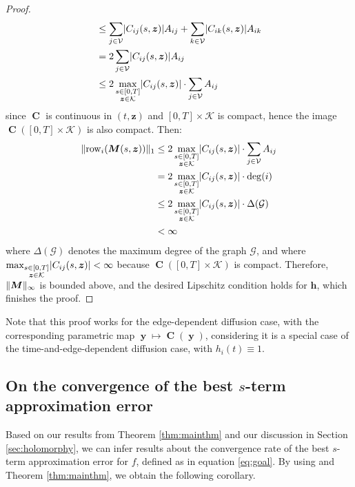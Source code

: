 \documentclass[12pt, oneside]{report}   	%
\DeclarePairedDelimiter{\abs}{\lvert}{\rvert}
\DeclarePairedDelimiter{\norm}{\lVert}{\rVert}        %
\DeclareMathOperator{\CC}{\boldsymbol{C}}
\DeclareMathOperator{\MM}{\boldsymbol{M}}
\DeclareMathOperator{\y}{\boldsymbol{y}}
\begin{document}
\begin{proof}
\begin{align*}
    &\leq \sum_{j\in\mathcal{V}}\abs{C_{ij}(s,\boldsymbol{z})}A_{ij} + \sum_{k\in\mathcal{V}}\abs{C_{ik}(s,\boldsymbol{z})}A_{ik} \\
    &= 2\sum_{j\in\mathcal{V}}\abs{C_{ij}(s,\boldsymbol{z})}A_{ij} \\   
    &\leq 2 \max_{\substack{s\in[0,T] \\ \boldsymbol{z}\in\mathcal{K}}}\abs{C_{ij}(s,\boldsymbol{z})}\cdot \sum_{j\in\mathcal{V}}A_{ij}
\end{align*}
since $\CC$ is continuous in $(t,\boldsymbol{z})$ and $[0,T]\times\mathcal{K}$ is compact, hence the image $\CC([0,T]\times\mathcal{K})$ is also compact. Then:
\begin{align*}
    \norm{\mathrm{row}_i(\MM(s,\boldsymbol{z}))}_1 &\leq 2 \max_{\substack{s\in[0,T] \\ \boldsymbol{z}\in\mathcal{K}}}\abs{C_{ij}(s,\boldsymbol{z})}\cdot \sum_{j\in\mathcal{V}}A_{ij} \\
    &= 2 \max_{\substack{s\in[0,T] \\ \boldsymbol{z}\in\mathcal{K}}}\abs{C_{ij}(s,\boldsymbol{z})}\cdot \deg(i) \\
    &\leq 2 \max_{\substack{s\in[0,T] \\ \boldsymbol{z}\in\mathcal{K}}}\abs{C_{ij}(s,\boldsymbol{z})}\cdot \Delta(\mathcal{G})\\
    &< \infty
\end{align*}
where $\Delta(\mathcal{G})$ denotes the maximum degree of the graph $\mathcal{G}$, and where $\max_{\substack{s\in[0,T] \\ \boldsymbol{z}\in\mathcal{K}}}\abs{C_{ij}(s,\boldsymbol{z})}<\infty$ because $\CC([0,T]\times\mathcal{K})$ is compact. Therefore, $\norm{\MM}_\infty$ is bounded above, and the desired Lipschitz condition holds for $\boldsymbol{h}$, which finishes the proof.
\end{proof}

\noindent Note that this proof works for the edge-dependent diffusion case, with the corresponding parametric map $\y\mapsto\CC(\y)$, considering it is a special case of the time-and-edge-dependent diffusion case, with $h_i(t)\equiv 1$.

\subsection{On the convergence of the best $s$-term approximation error}

Based on our results from Theorem \ref{thm:mainthm} and our discussion in Section \ref{sec:holomorphy}, we can infer results about the convergence rate of the best $s$-term approximation error for $f$, defined as in equation \eqref{eq:goal}. By using \cite[Theorem~3.15]{sparsepoly} and Theorem \ref{thm:mainthm}, we obtain the following corollary. 
\end{document}
